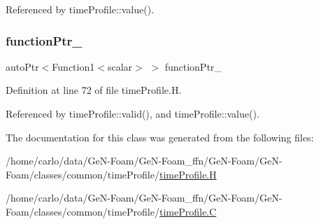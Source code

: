 Referenced by time\+Profile\+::value().

\mbox{\label{classFoam_1_1timeProfile_ae45cec85de6c65941ab18eff890a495e}} 
\subsubsection{\texorpdfstring{function\+Ptr\+\_\+}{functionPtr\_}}
{\footnotesize\ttfamily auto\+Ptr$<$Function1$<$scalar$>$ $>$ function\+Ptr\+\_\+\hspace{0.3cm}{\ttfamily [protected]}}



Definition at line 72 of file time\+Profile.\+H.



Referenced by time\+Profile\+::valid(), and time\+Profile\+::value().



The documentation for this class was generated from the following files\+:\begin{DoxyCompactItemize}
\item 
/home/carlo/data/\+Ge\+N-\/\+Foam/\+Ge\+N-\/\+Foam\+\_\+ffn/\+Ge\+N-\/\+Foam/\+Ge\+N-\/\+Foam/classes/common/time\+Profile/\hyperlink{timeProfile_8H}{time\+Profile.\+H}\item 
/home/carlo/data/\+Ge\+N-\/\+Foam/\+Ge\+N-\/\+Foam\+\_\+ffn/\+Ge\+N-\/\+Foam/\+Ge\+N-\/\+Foam/classes/common/time\+Profile/\hyperlink{timeProfile_8C}{time\+Profile.\+C}\end{DoxyCompactItemize}
